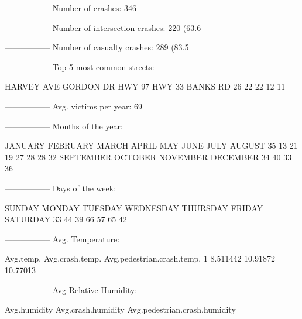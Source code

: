 \documentclass[11pt, a4paper]{article}
\begin{document}
\begin{Schunk}
\begin{Soutput}
-----------------
Number of crashes: 346
\end{Soutput}
\begin{Soutput}
-----------------
Number of intersection crashes: 220 (63.6%
\end{Soutput}
\begin{Soutput}
-----------------
Number of casualty crashes: 289 (83.5%
\end{Soutput}
\begin{Soutput}
-----------------
Top 5 most common streets:
\end{Soutput}
\begin{Soutput}
HARVEY AVE  GORDON DR     HWY 97     HWY 33   BANKS RD 
        26         22         22         12         11 
\end{Soutput}
\begin{Soutput}
-----------------
Avg. victims per year: 69
\end{Soutput}
\begin{Soutput}
-----------------
Months of the year:
\end{Soutput}
\begin{Soutput}
  JANUARY  FEBRUARY     MARCH     APRIL       MAY      JUNE      JULY    AUGUST 
       35        13        21        19        27        28        28        32 
SEPTEMBER   OCTOBER  NOVEMBER  DECEMBER 
       34        40        33        36 
\end{Soutput}
\begin{Soutput}
-----------------
Days of the week:
\end{Soutput}
\begin{Soutput}
   SUNDAY    MONDAY   TUESDAY WEDNESDAY  THURSDAY    FRIDAY  SATURDAY 
       33        44        39        66        57        65        42 
\end{Soutput}
\begin{Soutput}
-----------------
Avg. Temperature:
\end{Soutput}
\begin{Soutput}
  Avg.temp. Avg.crash.temp. Avg.pedestrian.crash.temp.
1  8.511442        10.91872                   10.77013
\end{Soutput}
\begin{Soutput}
-----------------
Avg Relative Humidity:
\end{Soutput}
\begin{Soutput}
  Avg.humidity Avg.crash.humidity Avg.pedestrian.crash.humidity

\end{Soutput}
\end{Schunk}
\end{document}
